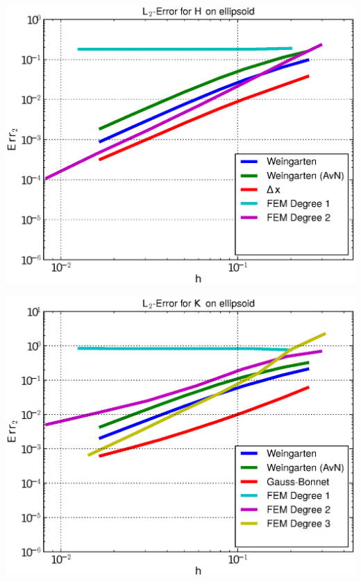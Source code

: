 \documentclass[handout]{beamer}
\begin{document}
\begin{frame}
\begin{overprint}
\begin{minipage}[t]{0.49\textwidth}
            \centering\includegraphics[width=\textwidth]{bilder/Curvature/heineC/ErrHL2_5.eps}
          \end{minipage}
          \begin{minipage}[t]{0.49\textwidth}
            \centering\includegraphics[width=\textwidth]{bilder/Curvature/heineC/ErrKL2_6.eps}
          \end{minipage}\hfill
          \begin{minipage}[t]{0.49\textwidth}

\end{minipage}
\end{overprint}
\end{frame}
\end{document}
